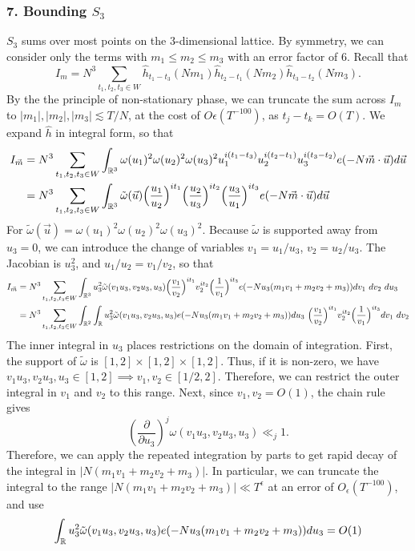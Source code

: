 \subsubsection*{7. Bounding $S_3$}
$S_3$ sums over most points on the $3$-dimensional lattice. By symmetry, we can consider only the terms with $m_1\leq m_2\leq m_3$ with an error factor of $6$.
Recall that \[
I_m=N^3\sum_{t_1,t_2,t_3\in W}\hat{h}_{t_1-t_3}(Nm_1)\hat{h}_{t_2-t_1}(Nm_2)\hat{h}_{t_3-t_2}(Nm_3).
\]
By the the principle of non-stationary phase, we can truncate the sum across $I_m$ to $|m_1|,|m_2|,|m_3|\lesssim T/N$, at the cost of $O\epsilon(T^{-100})$, as $t_j-t_k=O(T)$.
We expand $\hat{h}$ in integral form, so that \begin{align*}
    I_{\vec{m}}&=N^3\sum_{t_1,t_2,t_3\in W}\int_{\mathbb{R}^3} \omega(u_1)^2\omega(u_2)^2\omega(u_3)^2 u_1^{i(t_1-t_3)}u_2^{i(t_2-t_1)}u_3^{i(t_3-t_2)} e(-N\vec{m}\cdot \vec{u}) d\vec{u}\\ &=N^3\sum_{t_1,t_2,t_3\in W}\int_{\mathbb{R}^3} \tilde{\omega}(\vec{u}) \Big(\frac{u_1}{u_2}\Big)^{it_1}\Big(\frac{u_2}{u_3}\Big)^{it_2}\Big(\frac{u_3}{u_1}\Big)^{it_3}e(-N\vec{m}\cdot \vec{u}) d\vec{u}
\end{align*}
For $\tilde{\omega}(\vec{u})=\omega(u_1)^2\omega(u_2)^2\omega(u_3)^2$. Because $\tilde{\omega}$ is supported away from $u_3=0$, we can introduce the change of variables $v_1=u_1/u_3$, $v_2=u_2/u_3$. The Jacobian is $u_3^2$, and $u_1/u_2=v_1/v_2$, so that \begin{align*}
    I_{\vec{m}}& = N^3\sum_{t_1,t_2,t_3\in W}\int_{\mathbb{R}^3} u_3^2 \tilde{\omega}(v_1u_3,v_2u_3,u_3) \Big(\frac{v_1}{v_2}\Big)^{it_1} v_2^{it_2}\Big(\frac{1}{v_1}\Big)^{it_3}e(-Nu_3(m_1v_1+m_2v_2+m_3)) dv_1\ dv_2 \ du_3\\ 
    & = N^3\sum_{t_1,t_2,t_3\in W}\int_{\mathbb{R}^2}\int_{\mathbb{R}} u_3^2 \tilde{\omega}(v_1u_3,v_2u_3,u_3)e(-Nu_3(m_1v_1+m_2v_2+m_3))   du_3 \  \Big(\frac{v_1}{v_2}\Big)^{it_1} v_2^{it_2}\Big(\frac{1}{v_1}\Big)^{it_3}  dv_1\ dv_2 
\end{align*}
The inner integral in $u_3$ places restrictions on the domain of integration. First, the support of $\tilde{\omega}$ is $[1,2]\times [1,2]\times [1,2]$. Thus, if it is non-zero, we have $v_1u_3,v_2u_3,u_3\in [1,2]\implies v_1,v_2\in [1/2,2]$. Therefore, we can restrict the outer integral in $v_1$ and $v_2$ to this range. Next, since $v_1,v_2=O(1)$, the chain rule gives\[
\left(\frac{\partial}{\partial u_3}\right)^j{\omega}(v_1u_3,v_2u_3,u_3)\ll_j 1.\]
Therefore, we can apply the repeated integration by parts to get rapid decay of the integral in $|N(m_1v_1+m_2v_2+m_3)|$. In particular, we can truncate the integral to the range $|N(m_1v_1+m_2v_2+m_3)|\ll T^\epsilon$ at an error of $O_{\epsilon}(T^{-100})$, and use \[
    \int_{\mathbb{R}} u_3^2 \tilde{\omega}(v_1u_3,v_2u_3,u_3)e(-Nu_3(m_1v_1+m_2v_2+m_3))   du_3=O(1)
\]

